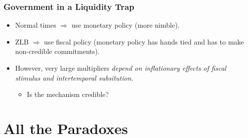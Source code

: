 \documentclass[english,xcolor=svgnames]{beamer}
\begin{document}
\begin{frame}
\frametitle{Government in a Liquidity Trap}
\begin{itemize}
	\item Normal times $\Rightarrow$ use monetary policy (more nimble).
	\item ZLB $\Rightarrow$ use fiscal policy (monetary policy has hands tied and
has to make non-credible commitments).
	\item However, very large multipliers \emph{depend on inflationary effects of fiscal stimulus and intertemporal subsitution.}
	\begin{itemize}
		\item Is the mechanism credible?
	\end{itemize}
\end{itemize}
\end{frame}

\section{All the Paradoxes}
\end{document}
